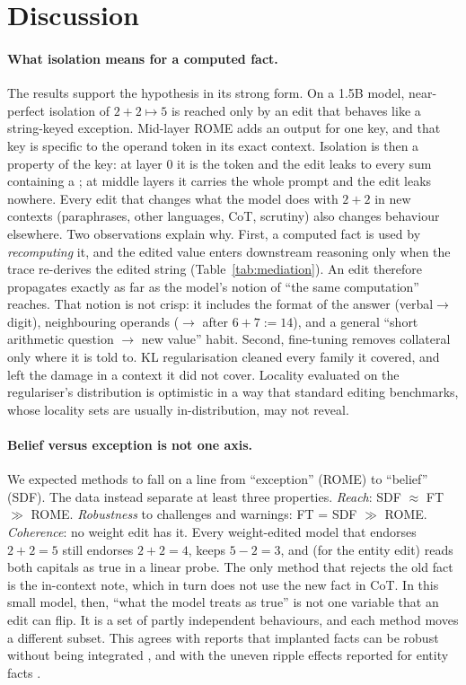 \section{Discussion}
\label{sec:discussion}

\paragraph{What isolation means for a computed fact.}
The results support the hypothesis in its strong form. On a 1.5B model, near-perfect isolation of $2+2\mapsto5$ is reached only by an edit that behaves like a string-keyed exception. Mid-layer ROME adds an output for one key, and that key is specific to the operand token in its exact context. Isolation is then a property of the key: at layer 0 it is the token  and the edit leaks to every sum containing a ; at middle layers it carries the whole prompt and the edit leaks nowhere. Every edit that changes what the model does with $2+2$ in new contexts (paraphrases, other languages, CoT, scrutiny) also changes behaviour elsewhere. Two observations explain why. First, a computed fact is used by \emph{recomputing} it, and the edited value enters downstream reasoning only when the trace re-derives the edited string (Table~\ref{tab:mediation}). An edit therefore propagates exactly as far as the model's notion of ``the same computation'' reaches. That notion is not crisp: it includes the format of the answer (verbal$\to$digit), neighbouring operands ($\to$ after $6+7:=14$), and a general ``short arithmetic question $\to$ new value'' habit. Second, fine-tuning removes collateral only where it is told to. KL regularisation cleaned every family it covered, and left the damage in a context it did not cover. Locality evaluated on the regulariser's distribution is optimistic in a way that standard editing benchmarks, whose locality sets are usually in-distribution, may not reveal.

\paragraph{Belief versus exception is not one axis.}
We expected methods to fall on a line from ``exception'' (ROME) to ``belief'' (SDF). The data instead separate at least three properties. \emph{Reach}: SDF $\approx$ FT $\gg$ ROME. \emph{Robustness} to challenges and warnings: FT = SDF $\gg$ ROME. \emph{Coherence}: no weight edit has it. Every weight-edited model that endorses $2+2=5$ still endorses $2+2=4$, keeps $5-2=3$, and (for the entity edit) reads both capitals as true in a linear probe. The only method that rejects the old fact is the in-context note, which in turn does not use the new fact in CoT. In this small model, then, ``what the model treats as true'' is not one variable that an edit can flip. It is a set of partly independent behaviours, and each method moves a different subset. This agrees with reports that implanted facts can be robust without being integrated \citep{anthropic2025believe,lw2025falsefacts}, and with the uneven ripple effects reported for entity facts \citep{cohen2024ripple,qin2024ripple}.

